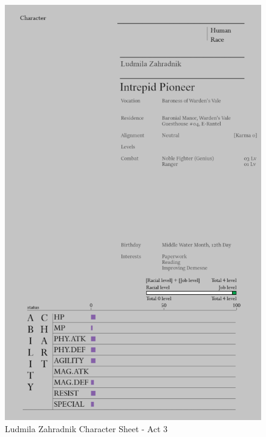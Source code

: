 \begin{figure}
    \centering
    \includegraphics[width=1\textwidth]{images/Rzh3Deu.png}
    \caption*{Ludmila Zahradnik Character Sheet - Act 3}
\end{figure}

